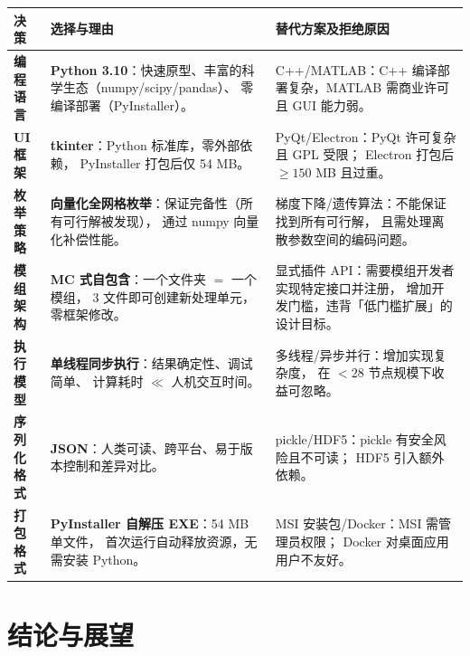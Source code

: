 \documentclass[12pt,a4paper]{ctexart}
\theoremstyle{definition}
\theoremstyle{remark}
\begin{document}
\begin{center}
\begin{longtable}{p{3cm}p{4.5cm}p{4.5cm}}
\toprule
\textbf{决策} & \textbf{选择与理由} & \textbf{替代方案及拒绝原因} \\
\midrule
\endhead
\bottomrule
\endfoot

\textbf{编程语言} &
\textbf{Python 3.10}：快速原型、丰富的科学生态（numpy/scipy/pandas）、
零编译部署（PyInstaller）。&
C++/MATLAB：C++ 编译部署复杂，MATLAB 需商业许可且 GUI 能力弱。\\[6pt]

\textbf{UI 框架} &
\textbf{tkinter}：Python 标准库，零外部依赖，
PyInstaller 打包后仅 54 MB。&
PyQt/Electron：PyQt 许可复杂且 GPL 受限；
Electron 打包后 $\ge 150$ MB 且过重。\\[6pt]

\textbf{枚举策略} &
\textbf{向量化全网格枚举}：保证完备性（所有可行解被发现），
通过 numpy 向量化补偿性能。&
梯度下降/遗传算法：不能保证找到所有可行解，
且需处理离散参数空间的编码问题。\\[6pt]

\textbf{模组架构} &
\textbf{MC 式自包含}：一个文件夹 $=$ 一个模组，
3 文件即可创建新处理单元，零框架修改。&
显式插件 API：需要模组开发者实现特定接口并注册，
增加开发门槛，违背「低门槛扩展」的设计目标。\\[6pt]

\textbf{执行模型} &
\textbf{单线程同步执行}：结果确定性、调试简单、
计算耗时 $\ll$ 人机交互时间。&
多线程/异步并行：增加实现复杂度，
在 $< 28$ 节点规模下收益可忽略。\\[6pt]

\textbf{序列化格式} &
\textbf{JSON}：人类可读、跨平台、易于版本控制和差异对比。&
pickle/HDF5：pickle 有安全风险且不可读；
HDF5 引入额外依赖。\\[6pt]

\textbf{打包格式} &
\textbf{PyInstaller 自解压 EXE}：54 MB 单文件，
首次运行自动释放资源，无需安装 Python。&
MSI 安装包/Docker：MSI 需管理员权限；
Docker 对桌面应用用户不友好。\\[6pt]

\end{longtable}
\end{center}

\section{结论与展望}
\end{document}
